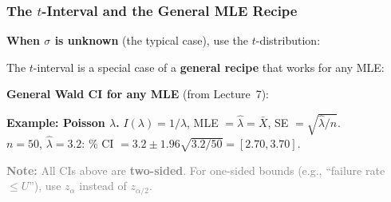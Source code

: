 \documentclass[aspectratio=169]{beamer}
\begin{document}
\begin{frame}
\frametitle{The $t$-Interval and the General MLE Recipe}

\small
\textbf{When $\sigma$ is unknown} (the typical case), use the $t$-distribution:

\vspace{0.05cm}
\begin{center}
\end{center}

\vspace{-0.1cm}
\pause
The $t$-interval is a special case of a \textbf{general recipe} that works for any MLE:

\vspace{0.05cm}
\textbf{General Wald CI for any MLE} (from Lecture~7):

\vspace{-0.1cm}
\begin{center}
\end{center}

\vspace{-0.15cm}
\pause
\textbf{Example: Poisson $\lambda$.} \; $I(\lambda) = 1/\lambda$, \; MLE $= \hat\lambda = \bar{X}$, \; SE $= \sqrt{\hat\lambda/n}$.\\
$n = 50$, $\hat\lambda = 3.2$:
\% CI $= 3.2 \pm 1.96\sqrt{3.2/50} = [2.70, 3.70]$.

\vspace{0.05cm}
{\footnotesize\textcolor{gray}{\textbf{Note:} All CIs above are \textbf{two-sided}. For one-sided bounds (e.g., ``failure rate $\leq U$''), use $z_\alpha$ instead of $z_{\alpha/2}$.}}
\end{frame}
\end{document}
